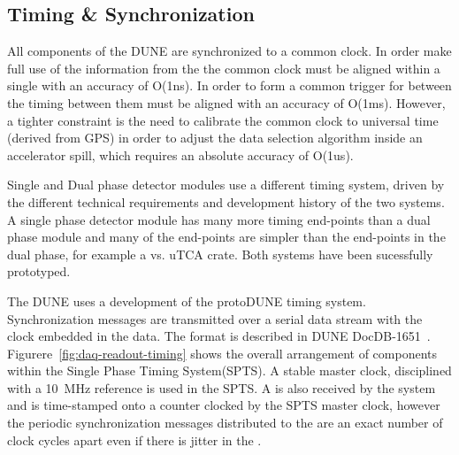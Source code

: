 \subsection{Timing \& Synchronization}
\label{sec:fd-daq-timing}



All components of the DUNE   are
synchronized to a common clock.  In order make full use of the
information from the  the common clock must be
aligned within a single  with an accuracy of O(1ns).
In order to form a common trigger for  between
 the timing between them must be aligned with an
accuracy of O(1ms).  However, a tighter constraint is the need to
calibrate the common clock to universal time (derived from GPS) in
order to adjust the data selection algorithm inside an accelerator
spill, which requires an absolute accuracy of O(1us).

Single and Dual phase detector modules use a different timing system,
driven by the different technical requirements and development history
of the two systems. A single phase detector module has many more
timing end-points than a dual phase module and many of the end-points
are simpler than the end-points in the dual phase, for example a 
vs. uTCA crate. Both systems have been sucessfully prototyped.

The DUNE   uses a development of the protoDUNE
timing system. Synchronization messages are transmitted over a serial
data stream with the clock embedded in the data. The format is
described in DUNE DocDB-1651~\cite{docdb-1651}. Figurere~\ref{fig:daq-readout-timing}
shows the overall arrangement of components within the Single Phase
Timing System(SPTS). A stable master clock, disciplined with a \SI{10}{\MHz}
reference is used in the SPTS. A  is
also received by the system and is time-stamped onto a counter clocked
by the SPTS master clock, however the periodic synchronization
messages distributed to the   are an exact number
of clock cycles apart even if there is jitter in the .

